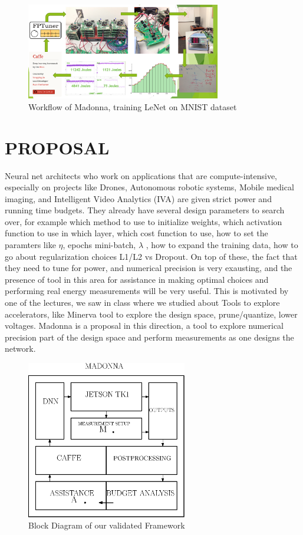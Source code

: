 \documentclass[letterpaper, 10 pt, conference]{ieeeconf}
\begin{document}
          \begin{figure}[h]
              \centering
              \includegraphics[width=85mm,scale=1]{wf}
              \caption{Workflow of Madonna, training LeNet on MNIST dataset}
              \label{q1}
          \end{figure}



\section{PROPOSAL}
         
Neural net architects who work on applications that are compute-intensive, especially on projects like Drones, Autonomous robotic systems, Mobile medical imaging, and Intelligent Video Analytics (IVA) are given strict power and running time budgets. They already have several design parameters to search over, for example which method to use to initialize weights, which activation function to use in which layer, which cost function to use, how to set the paramters like $\eta$, epochs mini-batch, $\lambda$ , how to expand the training data, how to go about regularization choices L1/L2 vs Dropout. 
On top of these, the fact that they need to tune for power, and numerical precision is very exausting, and the presence of tool in this area for assistance in making optimal choices and performing real energy measurements will be very useful. This is motivated by one of the lectures, we saw in class where we studied about Tools to explore accelerators, like Minerva tool to explore the design space, prune/quantize, lower voltages.
Madonna is a proposal in this direction, a tool to explore numerical precision part of the design space and perform measurements as one designs the network.

\begin{figure}[h]
  \centering
  \includegraphics[width=70mm,scale=1]{frame}
  \caption{Block Diagram of our validated Framework}
  \label{fig:frame}
\end{figure}
\end{document}
